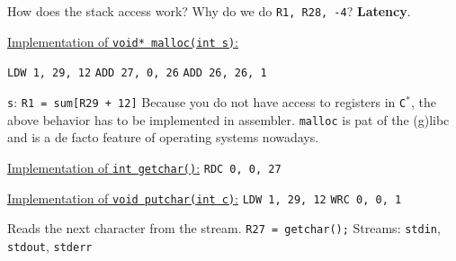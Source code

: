 \par{
    \noindent
    How does the stack access work? \newline
    Why do we do \texttt{R1, R28, -4}? \textbf{Latency}.
}

\par{
    \noindent
    \underline{Implementation of \texttt{void* malloc(int s)}:}
    \par{
        \indent\texttt{LDW 1, 29, 12} \newline
        \indent\texttt{ADD 27, 0, 26} \newline
        \indent\texttt{ADD 26, 26, 1} \newline
    }
    \par{
        \noindent
        \texttt{s}: \texttt{R1 = sum[R29 + 12]} \newline
        Because you do not have access to registers in \texttt{C$^*$}, the above behavior has to be implemented in assembler. \newline
        \texttt{malloc} is pat of the (g)libc and is a de facto feature of operating systems nowadays.
    }
    \par{
    	\noindent\underline{Implementation of \texttt{int getchar()}:} \newline
        \indent\texttt{RDC 0, 0, 27}
    }
    \par{
    	\noindent\underline{Implementation of \texttt{void putchar(int c)}:} \newline
        \indent\texttt{LDW 1, 29, 12} \newline
        \indent\texttt{WRC 0, 0, 1}
    }
    \par{
    	\noindent
    	Reads the next character from the stream. \newline
    	\texttt{R27 = getchar();} \newline
    	Streams: \texttt{stdin}, \texttt{stdout}, \texttt{stderr}
    }
    \par{
        \noindent
        \begin{figure}[H]
            \centering
\end{figure}}}
